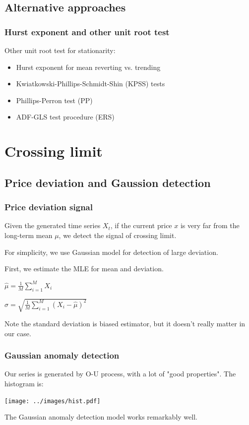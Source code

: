 \documentclass[11pt]{beamer}
\begin{document}
\subsection*{Alternative approaches}
\begin{frame}
\frametitle{Hurst exponent and other unit root test}
Other unit root test for stationarity:
\begin{itemize}
	\item Hurst exponent for mean reverting vs. trending
	\item Kwiatkowski-Phillips-Schmidt-Shin (KPSS) tests
	\item Phillips-Perron test (PP)
	\item ADF-GLS test procedure (ERS) 
\end{itemize}
\end{frame}



\section*{Crossing limit}
\subsection*{Price deviation and Gaussion detection}
\begin{frame}
\frametitle{Price deviation signal}
Given the generated time series $X_t$, if the current price $x$ is very far from the long-term mean $\mu$, we detect the signal of crossing limit.

For simplicity, we use Gaussian model for detection of large deviation. 

First, we estimate the MLE for mean and deviation.
\begin{center}
	$\hat{\mu}= \frac{1}{M}\sum_{i=1}^{M}X_i$
	
	$\hat{\sigma} = \sqrt{\frac{1}{M}\sum_{i=1}^{M}(X_i-\hat{\mu})^2}$

\end{center}
Note the standard deviation is biased estimator, but it doesn't really matter in our case.
\end{frame}

\begin{frame}
\frametitle{Gaussian anomaly detection}
Our series is generated by O-U process, with a lot of "good properties". The histogram is:
\begin{center}
	\noindent\texttt{[image: ../images/hist.pdf]}
\end{center}
The Gaussian anomaly detection model works remarkably well. 
\end{frame}
\end{document}
